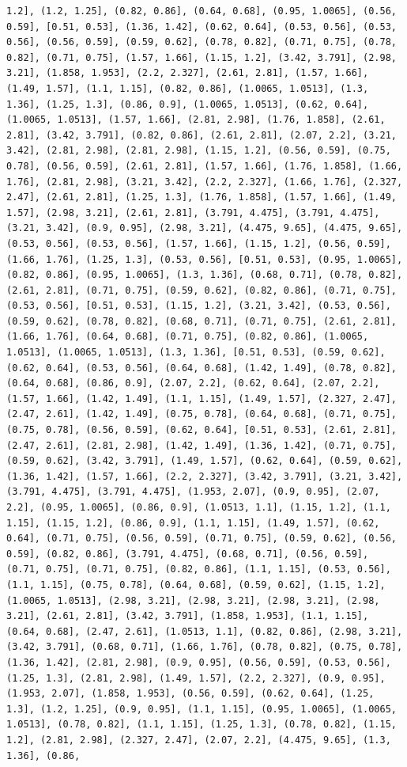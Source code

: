 \documentclass[12pt,fleqn]{article}\usepackage{../common}
\begin{document}
\begin{verbatim}
1.2], (1.2, 1.25], (0.82, 0.86], (0.64, 0.68], (0.95, 1.0065], (0.56, 0.59], [0.51, 0.53], (1.36, 1.42], (0.62, 0.64], (0.53, 0.56], (0.53, 0.56], (0.56, 0.59], (0.59, 0.62], (0.78, 0.82], (0.71, 0.75], (0.78, 0.82], (0.71, 0.75], (1.57, 1.66], (1.15, 1.2], (3.42, 3.791], (2.98, 3.21], (1.858, 1.953], (2.2, 2.327], (2.61, 2.81], (1.57, 1.66], (1.49, 1.57], (1.1, 1.15], (0.82, 0.86], (1.0065, 1.0513], (1.3, 1.36], (1.25, 1.3], (0.86, 0.9], (1.0065, 1.0513], (0.62, 0.64], (1.0065, 1.0513], (1.57, 1.66], (2.81, 2.98], (1.76, 1.858], (2.61, 2.81], (3.42, 3.791], (0.82, 0.86], (2.61, 2.81], (2.07, 2.2], (3.21, 3.42], (2.81, 2.98], (2.81, 2.98], (1.15, 1.2], (0.56, 0.59], (0.75, 0.78], (0.56, 0.59], (2.61, 2.81], (1.57, 1.66], (1.76, 1.858], (1.66, 1.76], (2.81, 2.98], (3.21, 3.42], (2.2, 2.327], (1.66, 1.76], (2.327, 2.47], (2.61, 2.81], (1.25, 1.3], (1.76, 1.858], (1.57, 1.66], (1.49, 1.57], (2.98, 3.21], (2.61, 2.81], (3.791, 4.475], (3.791, 4.475], (3.21, 3.42], (0.9, 0.95], (2.98, 3.21], (4.475, 9.65], (4.475, 9.65], (0.53, 0.56], (0.53, 0.56], (1.57, 1.66], (1.15, 1.2], (0.56, 0.59], (1.66, 1.76], (1.25, 1.3], (0.53, 0.56], [0.51, 0.53], (0.95, 1.0065], (0.82, 0.86], (0.95, 1.0065], (1.3, 1.36], (0.68, 0.71], (0.78, 0.82], (2.61, 2.81], (0.71, 0.75], (0.59, 0.62], (0.82, 0.86], (0.71, 0.75], (0.53, 0.56], [0.51, 0.53], (1.15, 1.2], (3.21, 3.42], (0.53, 0.56], (0.59, 0.62], (0.78, 0.82], (0.68, 0.71], (0.71, 0.75], (2.61, 2.81], (1.66, 1.76], (0.64, 0.68], (0.71, 0.75], (0.82, 0.86], (1.0065, 1.0513], (1.0065, 1.0513], (1.3, 1.36], [0.51, 0.53], (0.59, 0.62], (0.62, 0.64], (0.53, 0.56], (0.64, 0.68], (1.42, 1.49], (0.78, 0.82], (0.64, 0.68], (0.86, 0.9], (2.07, 2.2], (0.62, 0.64], (2.07, 2.2], (1.57, 1.66], (1.42, 1.49], (1.1, 1.15], (1.49, 1.57], (2.327, 2.47], (2.47, 2.61], (1.42, 1.49], (0.75, 0.78], (0.64, 0.68], (0.71, 0.75], (0.75, 0.78], (0.56, 0.59], (0.62, 0.64], [0.51, 0.53], (2.61, 2.81], (2.47, 2.61], (2.81, 2.98], (1.42, 1.49], (1.36, 1.42], (0.71, 0.75], (0.59, 0.62], (3.42, 3.791], (1.49, 1.57], (0.62, 0.64], (0.59, 0.62], (1.36, 1.42], (1.57, 1.66], (2.2, 2.327], (3.42, 3.791], (3.21, 3.42], (3.791, 4.475], (3.791, 4.475], (1.953, 2.07], (0.9, 0.95], (2.07, 2.2], (0.95, 1.0065], (0.86, 0.9], (1.0513, 1.1], (1.15, 1.2], (1.1, 1.15], (1.15, 1.2], (0.86, 0.9], (1.1, 1.15], (1.49, 1.57], (0.62, 0.64], (0.71, 0.75], (0.56, 0.59], (0.71, 0.75], (0.59, 0.62], (0.56, 0.59], (0.82, 0.86], (3.791, 4.475], (0.68, 0.71], (0.56, 0.59], (0.71, 0.75], (0.71, 0.75], (0.82, 0.86], (1.1, 1.15], (0.53, 0.56], (1.1, 1.15], (0.75, 0.78], (0.64, 0.68], (0.59, 0.62], (1.15, 1.2], (1.0065, 1.0513], (2.98, 3.21], (2.98, 3.21], (2.98, 3.21], (2.98, 3.21], (2.61, 2.81], (3.42, 3.791], (1.858, 1.953], (1.1, 1.15], (0.64, 0.68], (2.47, 2.61], (1.0513, 1.1], (0.82, 0.86], (2.98, 3.21], (3.42, 3.791], (0.68, 0.71], (1.66, 1.76], (0.78, 0.82], (0.75, 0.78], (1.36, 1.42], (2.81, 2.98], (0.9, 0.95], (0.56, 0.59], (0.53, 0.56], (1.25, 1.3], (2.81, 2.98], (1.49, 1.57], (2.2, 2.327], (0.9, 0.95], (1.953, 2.07], (1.858, 1.953], (0.56, 0.59], (0.62, 0.64], (1.25, 1.3], (1.2, 1.25], (0.9, 0.95], (1.1, 1.15], (0.95, 1.0065], (1.0065, 1.0513], (0.78, 0.82], (1.1, 1.15], (1.25, 1.3], (0.78, 0.82], (1.15, 1.2], (2.81, 2.98], (2.327, 2.47], (2.07, 2.2], (4.475, 9.65], (1.3, 1.36], (0.86, 
\end{verbatim}
\end{document}
